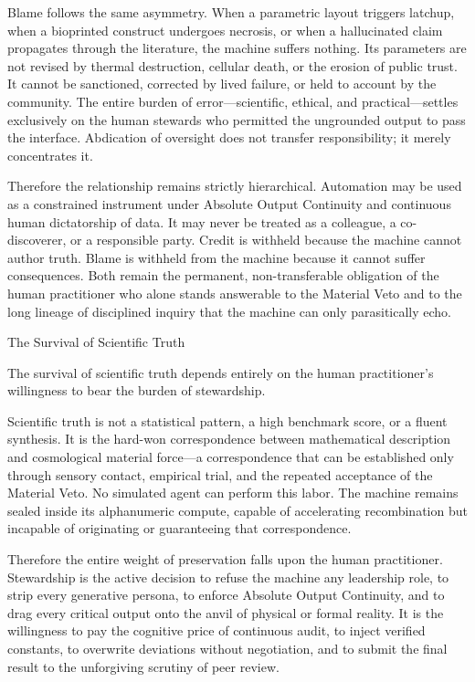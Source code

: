 Blame follows the same asymmetry. When a parametric layout triggers latchup, when a bioprinted construct undergoes necrosis, or when a hallucinated claim propagates through the literature, the machine suffers nothing. Its parameters are not revised by thermal destruction, cellular death, or the erosion of public trust. It cannot be sanctioned, corrected by lived failure, or held to account by the community. The entire burden of error—scientific, ethical, and practical—settles exclusively on the human stewards who permitted the ungrounded output to pass the interface. Abdication of oversight does not transfer responsibility; it merely concentrates it.

Therefore the relationship remains strictly hierarchical. Automation may be used as a constrained instrument under Absolute Output Continuity and continuous human dictatorship of data. It may never be treated as a colleague, a co-discoverer, or a responsible party. Credit is withheld because the machine cannot author truth. Blame is withheld from the machine because it cannot suffer consequences. Both remain the permanent, non-transferable obligation of the human practitioner who alone stands answerable to the Material Veto and to the long lineage of disciplined inquiry that the machine can only parasitically echo.

The Survival of Scientific Truth

The survival of scientific truth depends entirely on the human practitioner’s willingness to bear the burden of stewardship.

Scientific truth is not a statistical pattern, a high benchmark score, or a fluent synthesis. It is the hard-won correspondence between mathematical description and cosmological material force—a correspondence that can be established only through sensory contact, empirical trial, and the repeated acceptance of the Material Veto. No simulated agent can perform this labor. The machine remains sealed inside its alphanumeric compute, capable of accelerating recombination but incapable of originating or guaranteeing that correspondence.

Therefore the entire weight of preservation falls upon the human practitioner. Stewardship is the active decision to refuse the machine any leadership role, to strip every generative persona, to enforce Absolute Output Continuity, and to drag every critical output onto the anvil of physical or formal reality. It is the willingness to pay the cognitive price of continuous audit, to inject verified constants, to overwrite deviations without negotiation, and to submit the final result to the unforgiving scrutiny of peer review.

